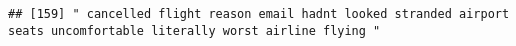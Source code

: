 \documentclass[
]{article}
\begin{document}
\begin{verbatim}
## [159] " cancelled flight reason email hadnt looked stranded airport seats uncomfortable literally worst airline flying "                                                                                                                                                                                                                                                                                                                                                                                                                                                                                                                                                                                                                                                                                                                                                                                                                                                                                                                                                                                                                                                                                                                                                                                                                                                                                                                                                                                                                                                                                                                                                                                                                                                                              

\end{verbatim}
\end{document}
